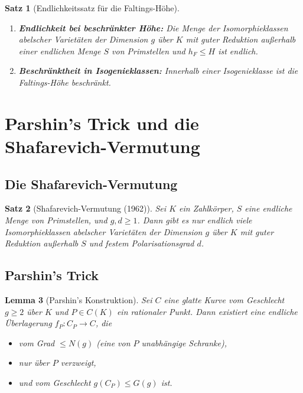 ﻿\documentclass[12pt,a4paper]{article}
\theoremstyle{plain}
\newtheorem{theorem}{Satz}[section]
\newtheorem{lemma}[theorem]{Lemma}
\theoremstyle{definition}
\theoremstyle{remark}
\begin{document}
\begin{theorem}[Endlichkeitssatz für die Faltings-Höhe]\label{thm:faltings_endlich}
\begin{enumerate}[leftmargin=2em]
  \item[(i)] \textbf{Endlichkeit bei beschränkter Höhe:}
    Die Menge der Isomorphieklassen abelscher Varietäten der Dimension $g$
    über $K$ mit guter Reduktion außerhalb einer endlichen Menge $S$
    von Primstellen und $h_F \leq H$ ist endlich.
  \item[(ii)] \textbf{Beschränktheit in Isogenieklassen:}
    Innerhalb einer Isogenieklasse ist die Faltings-Höhe beschränkt.
\end{enumerate}
\end{theorem}

\section{Parshin's Trick und die Shafarevich-Vermutung}

\subsection{Die Shafarevich-Vermutung}

\begin{theorem}[Shafarevich-Vermutung (1962)]\label{thm:shafarevich}
Sei $K$ ein Zahlkörper, $S$ eine endliche Menge von Primstellen, und $g, d \geq 1$.
Dann gibt es nur endlich viele Isomorphieklassen abelscher Varietäten der Dimension $g$
über $K$ mit guter Reduktion außerhalb $S$ und festem Polarisationsgrad $d$.
\end{theorem}

\subsection{Parshin's Trick}

\begin{lemma}[Parshin's Konstruktion]\label{lem:parshin}
Sei $C$ eine glatte Kurve vom Geschlecht $g \geq 2$ über $K$ und $P \in C(K)$ ein rationaler Punkt.
Dann existiert eine endliche Überlagerung $f_P: C_P \to C$, die
\begin{itemize}
  \item vom Grad $\leq N(g)$ (eine von $P$ unabhängige Schranke),
  \item nur über $P$ verzweigt,
  \item und vom Geschlecht $g(C_P) \leq G(g)$ ist.
\end{itemize}
\end{lemma}
\end{document}
